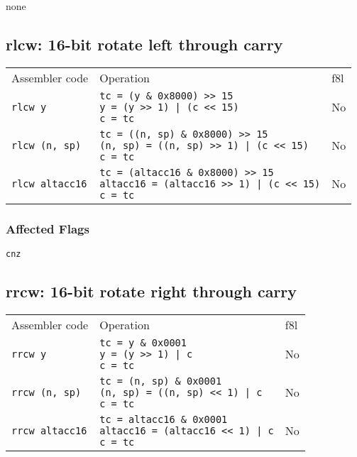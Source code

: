 \documentclass{book}
\begin{document}
none

\subsection{rlcw: 16-bit rotate left through carry}

\begin{tabular}{l l l}
Assembler code         & Operation                                                                                                             & f8l \\
\texttt{rlcw y}        & \makecell{\texttt{tc = (y \& 0x8000) >> 15}\\\texttt{y = (y >> 1) | (c << 15)}\\\texttt{c = tc}}                      & No \\
\texttt{rlcw (n, sp)}  & \makecell{\texttt{tc = ((n, sp) \& 0x8000) >> 15}\\\texttt{(n, sp) = ((n, sp) >> 1) | (c << 15)}\\\texttt{c = tc}}    & No \\
\texttt{rlcw altacc16} & \makecell{\texttt{tc = (altacc16 \& 0x8000) >> 15}\\\texttt{altacc16 = (altacc16 >> 1) | (c << 15)}\\\texttt{c = tc}} & No
\end{tabular}

\subsubsection*{Affected Flags}

\texttt{cnz}


\subsection{rrcw: 16-bit rotate right through carry}

\begin{tabular}{l l l}
Assembler code         & Operation                                                                                                   & f8l \\
\texttt{rrcw y}        & \makecell{\texttt{tc = y \& 0x0001}\\\texttt{y = (y >> 1) | c}\\\texttt{c = tc}}                    & No \\
\texttt{rrcw (n, sp)}  & \makecell{\texttt{tc = (n, sp) \& 0x0001}\\\texttt{(n, sp) = ((n, sp) << 1) | c}\\\texttt{c = tc}}  & No \\
\texttt{rrcw altacc16} & \makecell{\texttt{tc = altacc16 \& 0x0001}\\\texttt{altacc16 = (altacc16 << 1) | c}\\\texttt{c = tc}} & No
\end{tabular}
\end{document}
